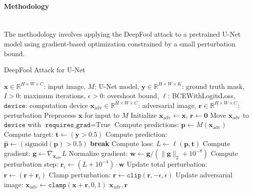 \documentclass[../main.tex]{subfiles}
\begin{document}
\paragraph{Methodology}\leavevmode\\
The methodology involves applying the DeepFool attack to a pretrained U-Net model using gradient-based optimization constrained by a small perturbation bound.



\begin{breakablealgorithm}{DeepFool Attack for U-Net}
\label{alg:deepfool_unet}
\begin{algorithmic}[1]
\Require $\mathbf{x} \in \mathbb{R}^{H \times W \times C}$: input image, $M$: U-Net model, $\mathbf{y} \in \mathbb{R}^{H \times W \times K}$: ground truth mask, $I > 0$: maximum iterations, $\epsilon > 0$: overshoot bound, $\ell$: BCEWithLogitsLoss, $\texttt{device}$: computation device
\Ensure $\mathbf{x}_{\text{adv}} \in \mathbb{R}^{H \times W \times C}$: adversarial image, $\mathbf{r} \in \mathbb{R}^{H \times W \times C}$: perturbation
\State Preprocess $\mathbf{x}$ for input to $M$ 
\State Initialize $\mathbf{x}_{\text{adv}} \gets \mathbf{x}$, $\mathbf{r} \gets \mathbf{0}$ 
\State Move $\mathbf{x}_{\text{adv}}$ to $\texttt{device}$ with $\texttt{requires\_grad}=\text{True}$ 
    \State Compute predictions: $\mathbf{p} \gets M(\mathbf{x}_{\text{adv}})$ 
    \State Compute target: $\mathbf{t} \gets (\mathbf{y} > 0.5)$ 
    \State Compute prediction: $\hat{\mathbf{p}} \gets (\text{sigmoid}(\mathbf{p}) > 0.5)$ 
     
        \State \textbf{break} 
    \EndIf
    \State Compute loss: $L \gets \ell(\mathbf{p}, \mathbf{t})$ 
    \State Compute gradient: $\mathbf{g} \gets \nabla_{\mathbf{x}_{\text{adv}}} L$ 
    \State Normalize gradient: $\mathbf{w} \gets \mathbf{g} / (\lVert \mathbf{g} \rVert_2 + 10^{-8})$ 
    \State Compute perturbation step: $\mathbf{r}_i \gets (L + 10^{-4}) \cdot \mathbf{w}$ 
    \State Update total perturbation: $\mathbf{r} \gets (\mathbf{r} + \mathbf{r}_i)$ 
    \State Clamp perturbation: $\mathbf{r} \gets \texttt{clip}(\mathbf{r}, -\epsilon, \epsilon)$ 
    \State Update adversarial image: $\mathbf{x}_{\text{adv}} \gets \texttt{clamp}(\mathbf{x} + \mathbf{r}, 0, 1)$ 
\EndFor
\State \Return $\mathbf{x}_{\text{adv}}, \mathbf{r}$
\end{algorithmic}
\end{breakablealgorithm}
\end{document}
